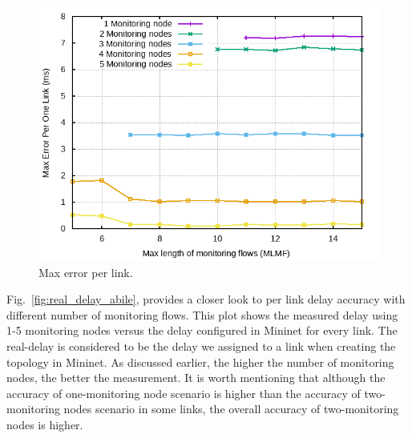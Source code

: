 \documentclass[10pt, journal, letterpaper]{IEEEtran}
\begin{document}
\begin{figure}
    \centering
    \includegraphics[width=.8\columnwidth]{img/eval_Abilene_Max_Length_of_Max_error_per_one_link.png}
    \caption{Max error per link.}
    \label{fig:max_error_abilen}
\end{figure}
Fig.~\ref{fig:real_delay_abile}, provides a closer look to per link delay accuracy with different number of monitoring flows. This plot shows the measured delay using 1-5 monitoring nodes versus the delay configured in Mininet for every link. The real-delay is considered to be the delay we assigned to a link when creating the topology in Mininet. As discussed earlier, the higher the number of monitoring nodes, the better the measurement. It is worth mentioning that although the accuracy of one-monitoring node scenario is higher than the accuracy of two-monitoring nodes scenario in some links, the overall accuracy of two-monitoring nodes is higher.
\end{document}
